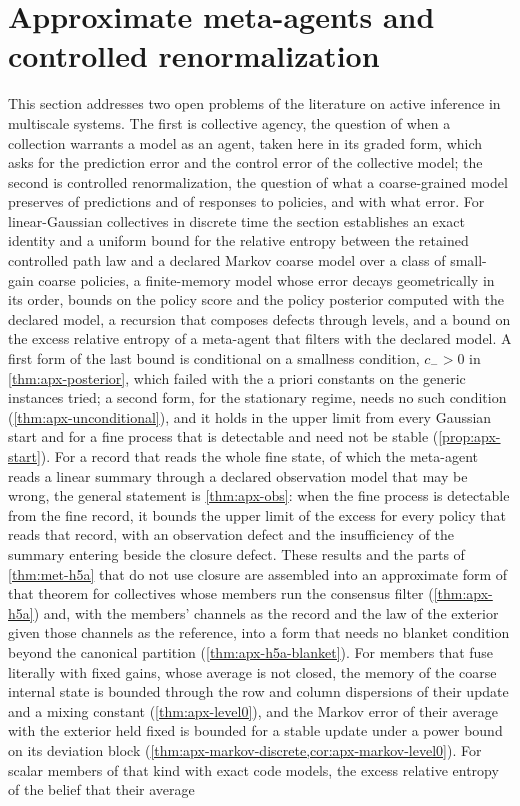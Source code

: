 \section{Approximate meta-agents and controlled renormalization}\label{sec:apx}

This section addresses two open problems of the literature on active inference in multiscale systems. The first is collective agency, the question of when a collection warrants a model as an agent, taken here in its graded form, which asks for the prediction error and the control error of the collective model; the second is controlled renormalization, the question of what a coarse-grained model preserves of predictions and of responses to policies, and with what error. For linear-Gaussian collectives in discrete time the section establishes an exact identity and a uniform bound for the relative entropy between the retained controlled path law and a declared Markov coarse model over a class of small-gain coarse policies, a finite-memory model whose error decays geometrically in its order, bounds on the policy score and the policy posterior computed with the declared model, a recursion that composes defects through levels, and a bound on the excess relative entropy of a meta-agent that filters with the declared model. A first form of the last bound is conditional on a smallness condition, $c_->0$ in \cref{thm:apx-posterior}, which failed with the a priori constants on the generic instances tried; a second form, for the stationary regime, needs no such condition (\cref{thm:apx-unconditional}), and it holds in the upper limit from every Gaussian start and for a fine process that is detectable and need not be stable (\cref{prop:apx-start}). For a record that reads the whole fine state, of which the meta-agent reads a linear summary through a declared observation model that may be wrong, the general statement is \cref{thm:apx-obs}: when the fine process is detectable from the fine record, it bounds the upper limit of the excess for every policy that reads that record, with an observation defect and the insufficiency of the summary entering beside the closure defect. These results and the parts of \cref{thm:met-h5a} that do not use closure are assembled into an approximate form of that theorem for collectives whose members run the consensus filter (\cref{thm:apx-h5a}) and, with the members' channels as the record and the law of the exterior given those channels as the reference, into a form that needs no blanket condition beyond the canonical partition (\cref{thm:apx-h5a-blanket}). For members that fuse literally with fixed gains, whose average is not closed, the memory of the coarse internal state is bounded through the row and column dispersions of their update and a mixing constant (\cref{thm:apx-level0}), and the Markov error of their average with the exterior held fixed is bounded for a stable update under a power bound on its deviation block (\cref{thm:apx-markov-discrete,cor:apx-markov-level0}). For scalar members of that kind with exact code models, the excess relative entropy of the belief that their average 